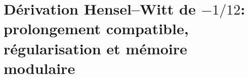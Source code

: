 \HMTFlushCurrentChapter
\chapter{Dérivation Hensel--Witt de \texorpdfstring{\(-1/12\)}{-1/12}: prolongement compatible, régularisation et mémoire modulaire}%
\begingroup
\renewcommand{\chapter}[2][]{}%
%
\endgroup

\HMTFlushCurrentChapter
\chapter{Dérivation déterminantielle de l'échelle absolue d'action : forme normale de Smith, conoyau d'ordre \(16\) et valuation \texorpdfstring{\(10^{-34}\)}{10^-34}}%
\begingroup
\renewcommand{\chapter}[2][]{}%
%
\endgroup


\HMTFlushCurrentChapter
\chapter{Caractère régional de degré \(5\), construction de \texorpdfstring{\(\eta_{\mathrm{ret}}\)}{eta ret} et mesure positive d'action sur le quotient des émissions}%
\begingroup
\renewcommand{\chapter}[2][]{}%
%
\endgroup


\HMTFlushCurrentChapter
\chapter{Dérivation autoduale de la constante de Planck et de sa droite d'action : périodicité temporelle de \(108\) phases, fermeture de Compton et covariance bidirectionnelle}%
\begingroup
\renewcommand{\chapter}[2][]{}%
%
\endgroup


